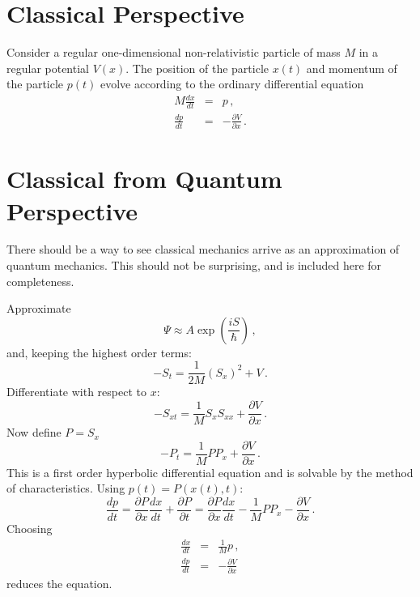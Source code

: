 \documentclass[prb,preprint]{revtex4-1}
\begin{document}
\section{Classical Perspective}

Consider a regular one-dimensional non-relativistic particle of mass $M$ in a regular potential $V(x)$.
The position of the particle $x(t)$ and momentum of the particle $p(t)$ evolve according
to the ordinary differential equation
\begin{eqnarray}
M \frac{dx}{dt} & = & p \,, \label{eq:hamilton-x}\\
\frac{dp}{dt} & = & -\frac{\partial V}{\partial x} \,. \label{eq:hamilton-p}
\end{eqnarray}


\section{Classical from Quantum Perspective}

There should be a way to see classical mechanics arrive as an approximation of quantum
mechanics.  This should not be surprising, and is included here for completeness.\cite{landau1977}

Approximate
\begin{equation}
\Psi \approx A \exp\left(\frac{iS}{\hbar}\right) \,,
\end{equation}
and, keeping the highest order terms:
\begin{equation}
-S_t = \frac{1}{2M}\left(S_x\right)^2 + V \,.
\end{equation}
Differentiate with respect to $x$:
\begin{equation}
-S_{xt} = \frac{1}{M}S_x S_{xx} + \frac{\partial V}{\partial x} \,.
\end{equation}
Now define $P = S_x$
\begin{equation}
-P_t = \frac{1}{M}P P_x + \frac{\partial V}{\partial x} \,.
\end{equation}
This is a first order hyperbolic differential equation and is solvable by the method of
characteristics.  Using $p(t) = P(x(t),t)$:
\begin{equation}
\frac{dp}{dt} = \frac{\partial P}{\partial x}\frac{dx}{dt} + \frac{\partial P}{\partial t}
= \frac{\partial P}{\partial x}\frac{dx}{dt} - \frac{1}{M}P P_x - \frac{\partial V}{\partial x} \,.
\end{equation}
Choosing
\begin{eqnarray}
\frac{dx}{dt} &=& \frac{1}{M}p \,, \\
\frac{dp}{dt} &=& -\frac{\partial V}{\partial x}
\end{eqnarray}
reduces the equation.
\end{document}
